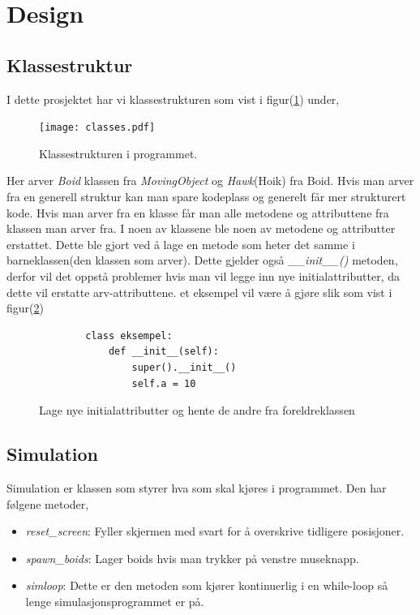 {\section{Design}
\subsection{Klassestruktur}
I dette prosjektet har vi klassestrukturen som vist i figur(\ref{klassestrukturen}) under,
\begin{figure}[hbt!]
{\centering
    \texttt{[image: classes.pdf]}
    \caption{Klassestrukturen i programmet.}
    \label{klassestrukturen}
\par}
\end{figure}

Her arver \emph{Boid} klassen fra \emph{MovingObject} og \emph{Hawk}(Hoik) fra Boid. Hvis man arver fra en generell struktur kan man spare kodeplass og generelt får mer strukturert kode. Hvis man arver fra en klasse får man alle metodene og attributtene fra klassen man arver fra. I noen av klassene ble noen av metodene og attributter erstattet. Dette ble gjort ved å lage en metode som heter det samme i barneklassen(den klassen som arver). Dette gjelder også \emph{\_\_init\_\_()} metoden, derfor vil det oppstå problemer hvis man vil legge inn nye initialattributter, da dette vil erstatte arv-attributtene. et eksempel vil være å gjøre slik som vist i figur(\ref{nye_att})

\begin{figure}[hbt!]
    \begin{lstlisting}
        class eksempel:
            def __init__(self):
                super().__init__()
                self.a = 10
    \end{lstlisting}
\caption{Lage nye initialattributter og hente de andre fra foreldreklassen}
\label{nye_att}
\end{figure}

\subsection{Simulation}

Simulation er klassen som styrer hva som skal kjøres i programmet. Den har følgene metoder,\\

\begin{itemize}
    \item \emph{reset\_screen}: Fyller skjermen med svart for å overskrive tidligere posisjoner.
    \item \emph{spawn\_boids}: Lager boids hvis man trykker på venstre museknapp.
    \item \emph{simloop}: Dette er den metoden som kjører kontinuerlig i en while-loop så lenge simulasjonsprogrammet er på.
\end{itemize}

}
